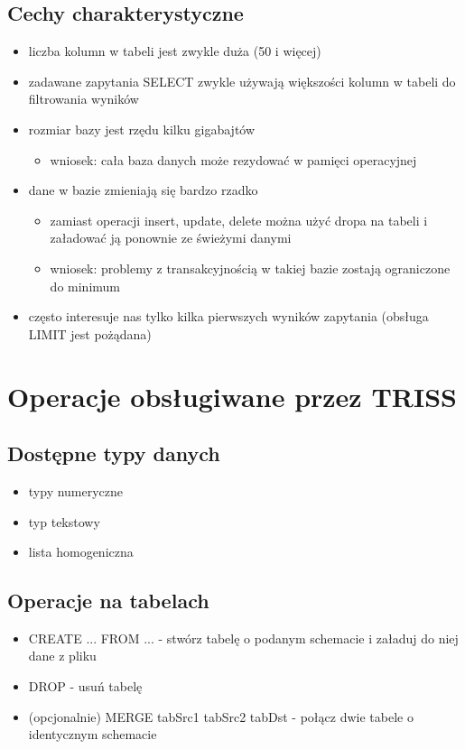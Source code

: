\documentclass[11pt]{article}
\begin{document}
        \subsection{Cechy charakterystyczne}
        \begin{itemize}
            \item liczba kolumn w tabeli jest zwykle duża (50 i więcej)
            \item zadawane zapytania SELECT zwykle używają większości kolumn w tabeli do filtrowania wyników
            \item rozmiar bazy jest rzędu kilku gigabajtów
                \begin{itemize}
                        \item wniosek: cała baza danych może rezydować w pamięci operacyjnej
                \end{itemize}
            \item dane w bazie zmieniają się bardzo rzadko
                \begin{itemize}
                        \item zamiast operacji insert, update, delete można użyć dropa na tabeli i załadować ją ponownie ze świeżymi danymi
                        \item wniosek: problemy z transakcyjnością w takiej bazie zostają ograniczone do minimum
                \end{itemize}
            \item często interesuje nas tylko kilka pierwszych wyników zapytania (obsługa LIMIT jest pożądana)
        \end{itemize}
    \section{Operacje obsługiwane przez TRISS}
        \subsection{Dostępne typy danych}
            \begin{itemize}
                \item typy numeryczne
                \item typ tekstowy
                \item lista homogeniczna
            \end{itemize}
        \subsection{Operacje na tabelach}
            \begin{itemize}
                \item CREATE ... FROM ... - stwórz tabelę o podanym schemacie i załaduj do niej dane z pliku
                \item DROP - usuń tabelę
                \item (opcjonalnie) MERGE tabSrc1 tabSrc2 tabDst - połącz dwie tabele o identycznym schemacie
            \end{itemize}
\end{document}
